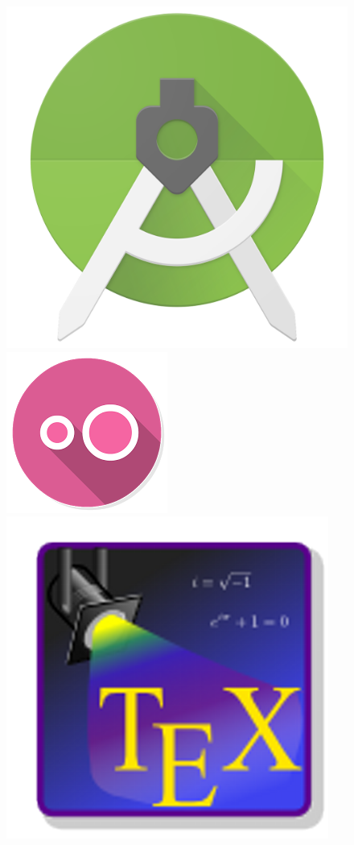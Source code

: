 \\\\
\begin{figure}[H]
\centering
\includegraphics[scale=0.06]{Figures/androidstudio.png}
\includegraphics[scale=0.38]{Figures/genymotion.png}
\includegraphics[scale=0.18]{Figures/texstudio.png}

\end{figure}
